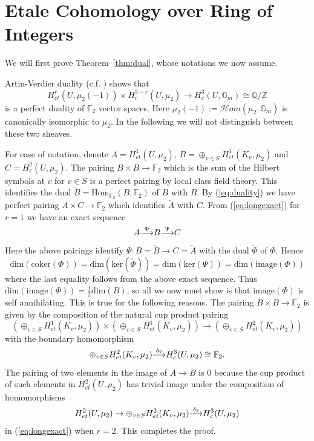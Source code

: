 \documentclass[noams]{compositio}
\theoremstyle{definition} %
\theoremstyle{remark} %
\newcommand{\cH}{\mathcal{H}}
\newcommand{\F}{\mathbb{F}}
\newcommand{\G}{\mathbb{G}}
\newcommand{\Q}{\mathbb{Q}}
\newcommand{\Z}{\mathbb{Z}}
\def\arrow#1#2{\smash{\mathop{\longrightarrow}\limits^{#1}_{#2}}} %
\begin{document}
\section{Etale Cohomology over Ring of Integers}\label{sec:etale}

We will first prove Theorem~\ref{thm:dual}, whose notations we now assume.


Artin-Verdier duality (c.f. \cite[section II.3]{Milne2006}) shows that
\begin{equation}
\label{eq:duality}
H^r_{et}(U,\mu_2(-1))\times H^{3-r}_c(U, \mu_2)\to H^3_c(U, \G_m)\cong \Q/\Z
\end{equation}
is a perfect duality of $\F_2$ vector spaces. Here $\mu_2(-1):=\cH om(\mu_2, \G_m)$ is canonically isomorphic to $\mu_2$. In the following we will not distinguish between these two sheaves.

For ease of notation, denote $A = H^1_{et}(U, \mu_2)$, $B = \oplus_{v\in S} H^1_{et}(K_v, \mu_2)$ and $C = H^2_c(U, \mu_2)$.
The pairing $B \times B \to \F_2$ which is the sum of the Hilbert symbols at $v$ for $v \in S$
is a perfect pairing by local class field theory.  This identifies the dual $\check B = \mathrm{Hom}_{\F_2}(B,\F_2)$
of $B$ with $B$.  By (\ref{eq:duality}) we have perfect pairing
$A \times C \to \F_2$ which identifies $\check A$ with $C$.   From (\ref{eq:longexact}) for $r = 1$ we have
an exact sequence
$$A \arrow{\Phi}{} B \arrow{\Psi}{} C$$
Here the above pairings identify $\Psi: B = \check {B}  \to C = \check{A}$ with the dual $\check{\Phi}$ of $\Phi$.
Hence
$$\mathrm{dim}(\mathrm{coker}(\Phi)) = \mathrm{dim}(\mathrm{ker}(\check \Phi))  = \mathrm{dim}(\mathrm{ker}(\Psi)) = \mathrm{dim}(\mathrm{image}(\Phi))$$
where the last equality follows from the above exact sequence. Thus
$\mathrm{dim}(\mathrm{image}(\Phi)) = \frac{1}{2} \mathrm{dim}(B)$, so all we now must show is
that $\mathrm{image}(\Phi)$ is self annihilating.  This is true for the following reasons.  The pairing $B \times B \to \F_2$
is given by the composition of the natural cup product pairing
$$\left (\oplus_{v\in S} H^1_{et}(K_v, \mu_2) \right ) \times \left (\oplus_{v\in S} H^1_{et}(K_v, \mu_2) \right )  \to
\left (\oplus_{v\in S} H^2_{et}(K_v, \mu_2) \right ) $$
with the boundary homomorphism
$$\oplus_{v\in S} H^2_{et}(K_v, \mu_2)  \arrow{\delta_2}{} H^3_c(U,\mu_2) \cong \F_2.$$
The pairing of two elements in the image of $A \to B$ is $0$ because the cup product of
such elements in $H^2_{et}(U,\mu_2)$ has trivial image under the composition of homomorphisms
$$H^2_{et}(U,\mu_2) \to \oplus_{v\in S} H^2_{et}(K_v, \mu_2)  \arrow{\delta_2}{} H^3_c(U,\mu_2)$$
in (\ref{eq:longexact}) when $r = 2$. This completes the proof.
\end{document}
